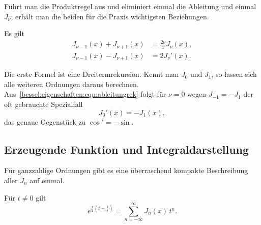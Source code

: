 Führt man die Produktregel aus und eliminiert einmal die Ableitung und einmal $J_\nu$, erhält man die beiden für die Praxis wichtigsten Beziehungen.

\begin{korollar}
\label{bessel:eigenschaften:korollar:rekursion}
Es gilt
\begin{align}
J_{\nu-1}(x) + J_{\nu+1}(x)
&=
\frac{2\nu}{x} J_\nu(x),
\label{bessel:eigenschaften:eqn:dreiterm}
\\
J_{\nu-1}(x) - J_{\nu+1}(x)
&=
2 J_\nu'(x).
\label{bessel:eigenschaften:eqn:ableitungrek}
\end{align}
\end{korollar}

Die erste Formel ist eine Dreitermrekursion.
%
Kennt man $J_0$ und $J_1$, so lassen sich alle weiteren Ordnungen daraus berechnen.
Aus~\eqref{bessel:eigenschaften:eqn:ableitungrek} folgt für $\nu=0$ wegen $J_{-1}=-J_1$ der oft gebrauchte Spezialfall
\begin{equation}
J_0'(x) = -J_1(x),
\label{bessel:eigenschaften:eqn:j0strich}
\end{equation}
das genaue Gegenstück zu $\cos' = -\sin$.

%
%
\subsection{Erzeugende Funktion und Integraldarstellung
\label{bessel:eigenschaften:subsection:erzeugend}}
Für ganzzahlige Ordnungen gibt es eine überraschend kompakte Beschreibung aller $J_n$ auf einmal.
%

\begin{satz}
\label{bessel:eigenschaften:satz:erzeugend}
Für $t\ne 0$ gilt
\begin{equation}
e^{\frac{x}{2}\left(t-\frac{1}{t}\right)}
=
\sum_{n=-\infty}^{\infty}
J_n(x)\, t^n.
\label{bessel:eigenschaften:eqn:erzeugend}
\end{equation}
\end{satz}

